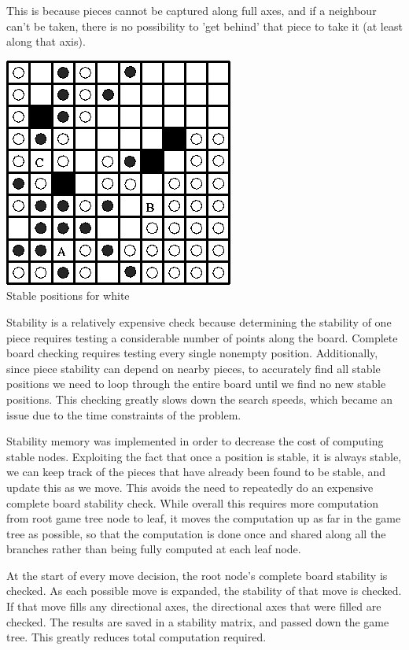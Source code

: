 \documentclass[10pt]{report}
\begin{document}
\begin{multicols}{2}
This is because pieces cannot be captured along full axes, and if a neighbour can't be taken, there is no possibility to 'get behind' that piece to take it (at least along that axis).

\begin{center}
\includegraphics[scale=0.50]{stability.PNG}\\
Stable positions for white
\end{center}

Stability is a relatively expensive check because determining the stability of one piece requires testing a considerable number of points along the board. Complete board checking requires testing every single nonempty position. Additionally, since piece stability can depend on nearby pieces, to accurately find all stable positions we need to loop through the entire board until we find no new stable positions. This checking greatly slows down the search speeds, which became an issue due to the time constraints of the problem.

Stability memory was implemented in order to decrease the cost of computing stable nodes. Exploiting the fact that once a position is stable, it is always stable, we can keep track of the pieces that have already been found to be stable, and update this as we move. This avoids the need to repeatedly do an expensive complete board stability check. While overall this requires more computation from root game tree node to leaf, it moves the computation up as far in the game tree as possible, so that the computation is done once and shared along all the branches rather than being fully computed at each leaf node.

At the start of every move decision, the root node's complete board stability is checked. As each possible move is expanded, the stability of that move is checked. If that move fills any directional axes, the directional axes that were filled are checked. The results are saved in a stability matrix, and passed down the game tree. This greatly reduces total computation required.


\end{multicols}
\end{document}
